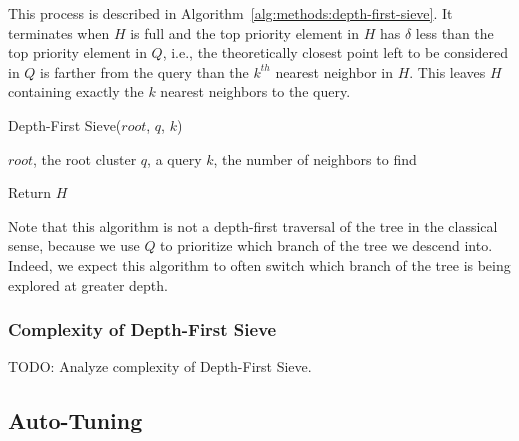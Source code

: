 This process is described in Algorithm~\ref{alg:methods:depth-first-sieve}.
It terminates when $H$ is full and the top priority element in $H$ has $\delta$ less than the top priority element in $Q$, i.e., the theoretically closest point left to be considered in $Q$ is farther from the query than the $k^{th}$ nearest neighbor in $H$.
This leaves $H$ containing exactly the $k$ nearest neighbors to the query.


\begin{algorithm} 
    \caption{Depth-First Sieve($root$, $q$, $k$)} 
    \label{alg:methods:depth-first-sieve} 
    \begin{algorithmic}
        \REQUIRE $root$, the root cluster
        \REQUIRE $q$, a query
        \REQUIRE $k$, the number of neighbors to find


            \ENDWHILE
            \ENDFOR
            \ENDWHILE
        \ENDWHILE
        \STATE Return $H$
    \end{algorithmic}
\end{algorithm}

Note that this algorithm is not a depth-first traversal of the tree in the classical sense, because we use $Q$ to prioritize which branch of the tree we descend into.
Indeed, we expect this algorithm to often switch which branch of the tree is being explored at greater depth.


\subsubsection{Complexity of Depth-First Sieve}
\label{sec:methods:knn-search:depth-first-sieve-complexity}

{\color{red}TODO: Analyze complexity of Depth-First Sieve.}


\subsection{Auto-Tuning}
\label{sec:methods:auto-tuning}

